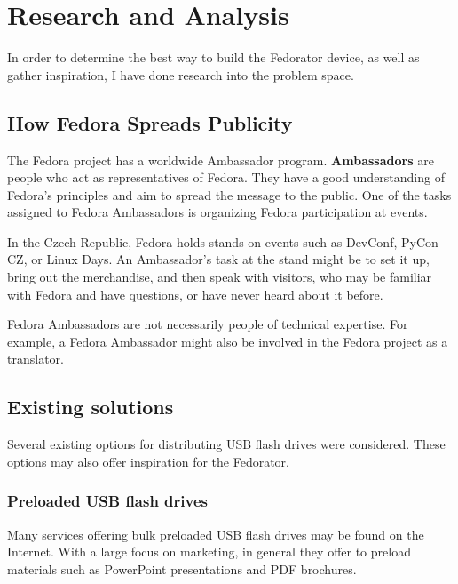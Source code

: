 \chapter{Research and Analysis}
    In order to determine the best way to build the Fedorator device, as well as gather inspiration, I have done research into the problem space.
    
    \section{How Fedora Spreads Publicity}
        The Fedora project has a worldwide Ambassador program.  \textbf{Ambassadors} are people who act as representatives of Fedora.  They have a good understanding of Fedora's principles and aim to spread the message to the public\cite{fedora-ambassadors}.  One of the tasks assigned to Fedora Ambassadors is organizing Fedora participation at events.
        
        In the Czech Republic, Fedora holds stands on events such as DevConf\cite{devconf}, PyCon CZ\cite{pycon-cz}, or Linux Days\cite{linux-days}.  An Ambassador's task at the stand might be to set it up, bring out the merchandise, and then speak with visitors, who may be familiar with Fedora and have questions, or have never heard about it before.
        
        Fedora Ambassadors are not necessarily people of technical expertise.  For example, a Fedora Ambassador might also be involved in the Fedora project as a translator.
        
    \section{Existing solutions}
        Several existing options for distributing USB flash drives were considered.  These options may also offer inspiration for the Fedorator.
        
        \subsection{Preloaded USB flash drives}
            Many services offering bulk preloaded USB flash drives may be found on the Internet.  With a large focus on marketing, in general they offer to preload materials such as PowerPoint presentations and PDF brochures\cite{flashbay-data-preloading}.
            
